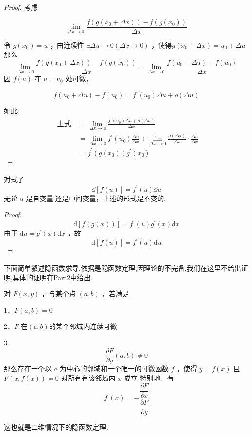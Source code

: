 \begin{proof}
	考虑
	
	$$
	\lim _{\Delta x \rightarrow 0} \frac{f(g(x_0+\Delta x))-f(g(x_0))}{\Delta x}
	$$
	
	
	令 $g\left(x_0\right)=u$ ，由连续性 $\exists \Delta u \rightarrow 0(\Delta x \rightarrow 0)$ ，使得$g\left(x_0+\Delta x\right)=u_0+\Delta u$那么
	$$\lim _{\Delta x \rightarrow 0} \frac{f( g\left(x_0+\Delta x\right)) -f\left(g\left(x_0\right)\right)}{\Delta x}=\lim _{\Delta x \rightarrow 0} \frac{f\left(u_0+\Delta u\right)-f\left(u_0\right)}{\Delta x}$$
	因 $f(u)$ 在 $u=u_0$ 处可微，
	
	$$
	f\left(u_0+\Delta u\right)-f\left(u_0\right)=f^{\prime}\left(u_0\right) \Delta u+o(\Delta u)
	$$
	
	如此
	$$\begin{aligned}
		\text { 上式 } & =\lim _{\Delta x \rightarrow 0} \frac{f^{\prime}\left(u_0\right) \Delta u+o(\Delta u)}{\Delta x} \\
		& =\lim _{\Delta x \rightarrow 0} f^{\prime}\left(u_0\right) \frac{\Delta u}{\Delta x}+\lim _{\Delta x \rightarrow 0} \frac{o(\Delta u)}{\Delta u} \cdot \frac{\Delta u}{\Delta x} \\
		& =f^{\prime}\left(g\left(x_0\right)\right) g^{\prime}\left(x_0\right)
	\end{aligned}$$
\end{proof}
\begin{proposition}
	对式子$$\dd[f(u)]=f^{\prime}(u) \dd u$$
	无论 $u$ 是自变量,还是中间变量，上述的形式是不变的.
\end{proposition}

\begin{proof}
	$$\mathrm{d}[f(g(x))]=f^{\prime}(u) g^{\prime}(x) \mathrm{d} x$$
	由于 $\mathrm{d} u=g^{\prime}(x) \mathrm{d} x$ ，故
	$$\mathrm{d}[f(u)]=f^{\prime}(u) \mathrm{d} u$$
\end{proof}
下面简单叙述隐函数求导,依据是隐函数定理,因理论的不完备,我们在这里不给出证明,具体的证明在Part2中给出.
\begin{theorem}
	对 $F(x, y)$ ，与某个点 $(a, b)$ ，若满足
	
	1．$F(a, b)=0$
	
	2．$F$ 在$\left(a,b\right)$的某个邻域内连续可微
	
	3.
	$$\frac{\partial F}{\partial y}(a, b) \neq 0 $$
	那么存在一个以 $a$ 为中心的邻域和一个唯一的可微函数 $f$ ，使得 $y=f(x)$ 且 $F(x, f(x))=0$ 对所有有该邻域内 $x$ 成立
	特别地，有
	$$f^{\prime}(x)=-\dfrac{\dfrac{\partial F}{\partial x}}{\dfrac{\partial F}{\partial y}}$$
\end{theorem}
这也就是二维情况下的隐函数定理.

